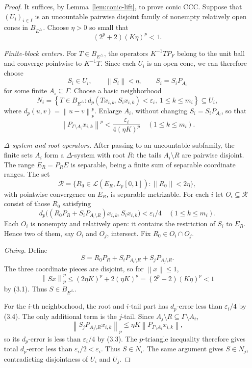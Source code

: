 \documentclass[11pt]{article}
\theoremstyle{definition}
\newcommand{\Lp}{L_p[0,1]}
\newcommand{\calL}{\mathcal L}
\newcommand{\calR}{\mathcal R}
\newcommand{\norm}[1]{\left\lVert #1\right\rVert}
\begin{document}
\begin{proof}
It suffices, by Lemma~\ref{lem:conic-lift}, to prove conic CCC.  Suppose that
$(U_i)_{i\in I}$ is an uncountable pairwise disjoint family of nonempty relatively
open cones in $B_{E^\triangle}$.  Choose $\eta>0$ so small that
\[
 (2^p+2)(K\eta)^p<1.                                    \tag{3.1}
\]

\emph{Finite-block centers.}
For $T\in B_{E^\triangle}$, the operators $K^{-1}TP_F$ belong to the unit ball
and converge pointwise to $K^{-1}T$.  Since each $U_i$ is an open cone, we can
therefore choose
\[
 S_i\in U_i,\qquad \norm{S_i}<\eta,\qquad S_i=S_iP_{A_i}
\]
for some finite $A_i\subseteq\Gamma$.
Choose a basic neighborhood
\[
 N_i=\left\{T\in B_{E^\triangle}:
 d_p(Tx_{i,k},S_ix_{i,k})<\varepsilon_i,
 \ 1\leq k\leq m_i\right\}\subseteq U_i,               \tag{3.2}
\]
where $d_p(u,v)=\norm{u-v}_p^p$.
Enlarge $A_i$, without changing $S_i=S_iP_{A_i}$, so that
\[
 \norm{P_{\Gamma\setminus A_i}x_{i,k}}^p
 <\frac{\varepsilon_i}{4(\eta K)^p}
 \quad(1\leq k\leq m_i).                                \tag{3.3}
\]

\emph{$\Delta$-system and root operators.}
After passing to an uncountable subfamily, the finite sets $A_i$ form a
$\Delta$-system with root $R$: the tails $A_i\setminus R$ are pairwise disjoint.
The range $E_R=P_RE$ is separable, being a finite sum of separable coordinate
ranges.  The set
\[
 \calR=\{R_0\in\calL(E_R,\Lp):\norm{R_0}<2\eta\},
\]
with pointwise convergence on $E_R$, is separable metrizable.
For each $i$ let $O_i\subseteq\calR$ consist of those $R_0$ satisfying
\[
 d_p\bigl((R_0P_R+S_iP_{A_i\setminus R})x_{i,k},
          S_ix_{i,k}\bigr)<\varepsilon_i/4
 \quad(1\leq k\leq m_i).                                \tag{3.4}
\]
Each $O_i$ is nonempty and relatively open: it contains the restriction of
$S_i$ to $E_R$.  Hence two of them, say $O_i$ and $O_j$, intersect.  Fix
$R_0\in O_i\cap O_j$.

\emph{Gluing.}
Define
\[
 S=R_0P_R+S_iP_{A_i\setminus R}+S_jP_{A_j\setminus R}.
\]
The three coordinate pieces are disjoint, so for $\norm{x}\leq1$,
\[
 \norm{Sx}_p^p
 \leq (2\eta K)^p+2(\eta K)^p
 =(2^p+2)(K\eta)^p<1
\]
by (3.1).  Thus $S\in B_{E^\triangle}$.

For the $i$-th neighborhood, the root and $i$-tail part has $d_p$-error less
than $\varepsilon_i/4$ by (3.4).  The only additional term is the $j$-tail.
Since $A_j\setminus R\subseteq\Gamma\setminus A_i$,
\[
 \norm{S_jP_{A_j\setminus R}x_{i,k}}_p
 \leq \eta K\norm{P_{\Gamma\setminus A_i}x_{i,k}},
\]
so its $d_p$-error is less than $\varepsilon_i/4$ by (3.3).  The
$p$-triangle inequality therefore gives total $d_p$-error less than
$\varepsilon_i/2<\varepsilon_i$.  Thus $S\in N_i$.  The same argument gives
$S\in N_j$, contradicting disjointness of $U_i$ and $U_j$.
\end{proof}
\end{document}
